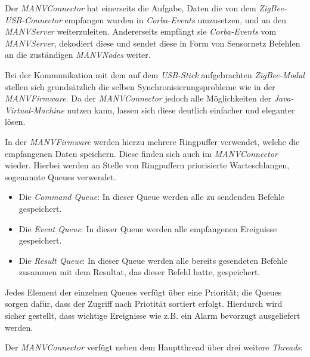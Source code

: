 Der \emph{MANVConnector} hat einerseits die Aufgabe, Daten die von dem \emph{ZigBee-USB-Connector} empfangen wurden in 
\emph{Corba-Events} umzusetzen, und an den \emph{MANVServer} weiterzuleiten. Andererseits empfängt sie 
\emph{Corba-Events} vom \emph{MANVServer}, dekodiert diese und sendet diese in Form von Sensornetz Befehlen an die 
zuständigen \emph{MANVNodes} weiter.

Bei der Kommunikation mit dem auf dem \emph{USB-Stick} aufgebrachten \emph{ZigBee-Modul} stellen sich grundsätzlich 
die selben Synchronisierungsprobleme wie in der \emph{MANVFirmware}. Da der \emph{MANVConnector} jedoch alle 
Möglichkeiten der \emph{Java-Virtual-Machine} nutzen kann, lassen sich diese deutlich einfacher und eleganter lösen. 

In der \emph{MANVFirmware} werden hierzu mehrere Ringpuffer verwendet, welche die empfangenen Daten speichern. Diese 
finden sich auch im \emph{MANVConnector} wieder. Hierbei werden an Stelle von Ringpuffern priorisierte Warteschlangen, 
sogenannte Queues verwendet. 

\begin{itemize}
    \item{Die \emph{Command Queue}:} In dieser Queue werden alle zu sendenden Befehle gespeichert.
    \item{Die \emph{Event Queue}:} In dieser Queue werden alle empfangenen Ereignisse gespeichert.
    \item{Die \emph{Result Queue}:} In dieser Queue werden alle bereits gesendeten Befehle zusammen mit dem
                             Resultat, das dieser Befehl hatte, gespeichert.
\end{itemize}

Jedes Element der einzelnen Queues verfügt über eine Priorität; die Queues sorgen dafür, dass der
Zugriff nach Priotität sortiert erfolgt. Hierdurch wird sicher gestellt, dass wichtige Ereignisse
wie z.B. ein Alarm bevorzugt ausgeliefert werden.

Der \emph{MANVConnector} verfügt neben dem Hauptthread über drei weitere \emph{Threads}:


